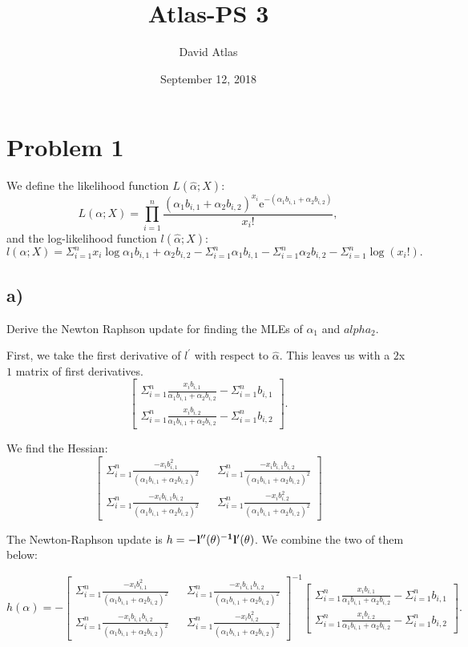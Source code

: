 \documentclass[]{article}
\title{Atlas-PS 3}
\author{David Atlas}
\date{September 12, 2018}
\begin{document}
\maketitle

\newcommand{\summ}{\Sigma_{i=1}^{n}}
\newcommand{\prodd}{\prod_{i=1}^{n}}
\newcommand{\pha}{\alpha_1 b_{i, 1} + \alpha_2 b_{i, 2}}
\newcommand{\gaus}[1]{\phi(x_i; \mu_{#1}, \sigma_{#1}^2)}
\newcommand{\gausk}[1]{\phi(x_i; \mu_{#1}^{(k)}, (\sigma_{#1}^2)^{(k)})}




\section{Problem 1}\label{problem-1}

We define the likelihood function \(L(\hat{\alpha}; X)\): \[
L(\alpha; X) = \prodd \frac{(\pha)^{x_i} \mathrm{e}^{-(\pha)}}{x_i!},
\] and the log-likelihood function \(l(\hat{\alpha}; X)\): \[
l(\alpha; X) = \summ x_i \log{\pha} - \summ{\alpha_1 b_{i, 1}} - 
  \summ{\alpha_2 b_{i,2}} - \summ \log(x_i !).
\]

\subsection{a)}\label{a}

Derive the Newton Raphson update for finding the MLEs of \(\alpha_1\)
and \(alpha_2\).

First, we take the first derivative of \(l^\prime\) with respect to
\(\hat{\alpha}\). This leaves us with a \(2\)x\(1\) matrix of first
derivatives. \[
\begin{bmatrix}
\summ \frac{x_i b_{i, 1}}{\pha} - \summ b_{i, 1} \\
\summ \frac{x_i b_{i, 2}}{\pha} - \summ b_{i, 2}
\end{bmatrix}.
\]

We find the Hessian: \[
\begin{bmatrix}
\summ \frac{-x_i b_{i, 1}^2}{(\pha)^2} && 
\summ \frac{-x_i b_{i, 1}b_{i, 2}}{(\pha)^2} \\
\summ \frac{-x_i b_{i, 1}b_{i, 2}}{(\pha)^2} &&
\summ \frac{-x_i b_{i, 2}^2}{(\pha)^2}
\end{bmatrix}
\]

The Newton-Raphson update is
\(h=-\bf{l}^{\prime\prime}(\bf{\theta})^{-1}\bf{l}^\prime(\bf{\theta})\).
We combine the two of them below:

\[
h(\alpha) = - \begin{bmatrix}
\summ \frac{-x_i b_{i, 1}^2}{(\pha)^2} && 
\summ \frac{-x_i b_{i, 1}b_{i, 2}}{(\pha)^2} \\
\summ \frac{-x_i b_{i, 1}b_{i, 2}}{(\pha)^2} &&
\summ \frac{-x_i b_{i, 2}^2}{(\pha)^2}
\end{bmatrix}^{-1} 
\begin{bmatrix}
\summ \frac{x_i b_{i, 1}}{\pha} - \summ b_{i, 1} \\
\summ \frac{x_i b_{i, 2}}{\pha} - \summ b_{i, 2}
\end{bmatrix}.
\]
\end{document}
